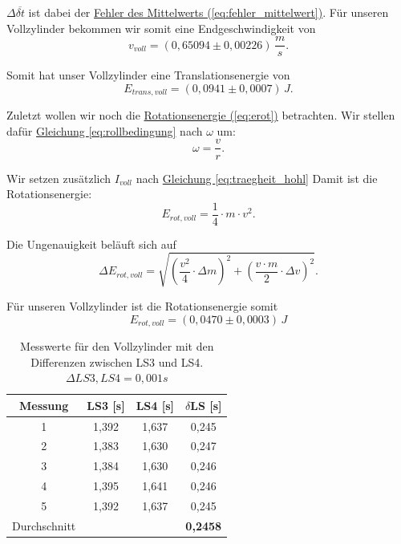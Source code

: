 $\Delta \overline{\delta t}$ ist dabei der \hyperref[eq:fehler_mittelwert]{Fehler des Mittelwerts (\ref*{eq:fehler_mittelwert})}. Für unseren Vollzylinder bekommen wir somit eine Endgeschwindigkeit von 
\begin{equation}
    \boxed{
        v_{voll} = (0,65094 \pm 0,00226) \, \frac{m}{s}
    }.
\end{equation}



Somit hat unser Vollzylinder eine Translationsenergie von
\begin{equation}
    \boxed{
        E_{trans,voll} = (0,0941 \pm 0,0007) \, J
    }.
\end{equation}

Zuletzt wollen wir noch die \hyperref[eq:erot]{Rotationsenergie (\ref*{eq:erot})} betrachten. Wir stellen dafür \hyperref[eq:rollbedingung]{Gleichung \ref*{eq:rollbedingung}} nach $\omega$ um:
\begin{equation}
    \omega = \frac{v}{r}.
\end{equation}

Wir setzen zusätzlich $I_{voll}$ nach \hyperref[eq:traegheit_hohl]{Gleichung \ref*{eq:traegheit_hohl}} Damit ist die Rotationsenergie:
\begin{equation}
    E_{rot,voll} = \frac{1}{4} \cdot m \cdot v^2.
\end{equation}

Die Ungenauigkeit beläuft sich auf
\begin{equation}
    \Delta E_{rot,voll} = \sqrt{\left(\frac{v^2}{4} \cdot \Delta m\right)^2 + \left(\frac{v\cdot m}{2} \cdot \Delta v\right)^2}.
\end{equation}

Für unseren Vollzylinder ist die Rotationsenergie somit
\begin{equation}
\boxed{
    E_{rot,voll} = (0,0470 \pm 0,0003) \, J
}
\end{equation}

\begin{table}[!ht]
    \centering
    \begin{tabular}{c | c | c | c}
    \toprule
    Messung & LS3 [s] & LS4 [s] & $\delta$LS [s] \\
    \hline
    1 & 1,392 & 1,637 & 0,245 \\
    2 & 1,383 & 1,630 & 0,247 \\
    3 & 1,384 & 1,630 & 0,246 \\
    4 & 1,395 & 1,641 & 0,246 \\
    5 & 1,392 & 1,637 & 0,245 \\
    \hline
    Durchschnitt &     &     & \textbf{0,2458} \\
    \bottomrule
    \end{tabular}
    \caption{Messwerte für den Vollzylinder mit den Differenzen zwischen LS3 und LS4. $\Delta LS3,LS4 = 0,001s$}
    \label{tab:Vollzylinder_ls}
\end{table}



